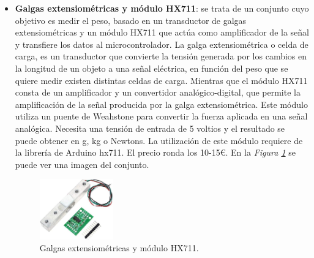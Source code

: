 \begin{itemize}
    \item \textbf{Galgas extensiométricas y módulo HX711}\cite{GyHX711_1,GyHX711_2}: se trata de un conjunto cuyo objetivo es medir el peso, basado en un transductor de galgas extensiométricas y un módulo HX711 que actúa como amplificador de la señal y transfiere los datos al microcontrolador. La galga extensiométrica o celda de carga, es un transductor que convierte la tensión generada por los cambios en la longitud de un objeto a una señal eléctrica, en función del peso que se quiere medir existen distintas celdas de carga. Mientras que el módulo HX711 consta de un amplificador y un convertidor analógico-digital, que permite la amplificación de la señal producida por la galga extensiométrica. Este módulo utiliza un puente de Weahstone para convertir la fuerza aplicada en una señal analógica. Necesita una tensión de entrada de 5 voltios y el resultado se puede obtener en g, kg o Newtons. La utilización de este módulo requiere de la librería de Arduino hx711. El precio ronda los 10-15€. En la \textit{Figura \ref{fig:HX711}} se puede ver una imagen del conjunto.
\begin{figure}[h!]
    \centering
    \includegraphics[width=0.3\textwidth]{img/GyHX711.jpg}
    \caption{Galgas extensiométricas y módulo HX711\cite{imgGyHX711}.}
    \label{fig:HX711} 
\end{figure}


\end{itemize}
